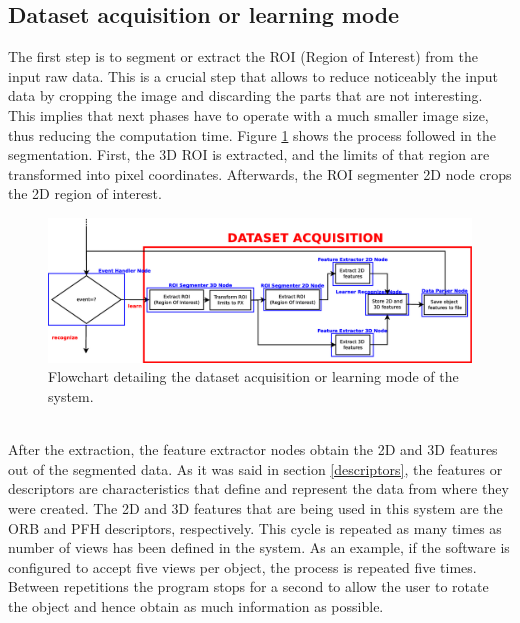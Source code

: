 \subsection{Dataset acquisition or learning mode}
\label{learning_mode}
The first step is to segment or extract the ROI (Region of Interest) from the input raw data. 
This is a crucial step that allows to reduce noticeably the input data by cropping the image and discarding the parts that are not interesting. 
This implies that next phases have to operate with a much smaller image size, thus reducing the computation time. 
Figure \ref{flowchart2} shows the process followed in the segmentation. 
First, the 3D ROI is extracted, and the limits of that region are transformed into pixel coordinates. 
Afterwards, the ROI segmenter 2D node crops the 2D region of interest. 
\begin{figure}[H]
	\begin{center}
\includegraphics[width=\linewidth]{img/diagrams/flowchart2.eps}
	\caption[Dataset acquisition flowchart]{Flowchart detailing the dataset acquisition or learning mode of the system.}
		\label{flowchart2}

	\end{center}
\end{figure}


\\

After the extraction, the feature extractor nodes obtain the 2D and 3D features out of the segmented data. 
As it was said in section \ref{descriptors}, the features or descriptors are characteristics that define and represent the data from where they were created. 
The 2D and 3D features that are being used in this system are the ORB and PFH descriptors, respectively. 
This cycle is repeated as many times as number of views has been defined in the system. 
As an example, if the software is configured to accept five views per object, the process is repeated five times. 
Between repetitions the program stops for a second to allow the user to rotate the object and hence obtain as much information as possible. 
\\

